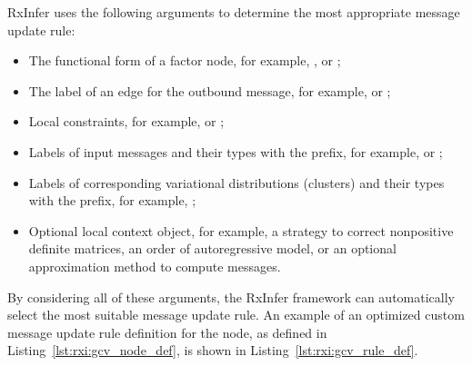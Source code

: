 
RxInfer uses the following arguments to determine the most appropriate message update rule:
  \begin{itemize} \itemsep0em
  \item The functional form of a factor node, for example, ,  or ;
  \item The label of an edge for the outbound message, for example,  or ; 
  \item Local constraints, for example,  or ; 
  \item Labels of input messages and their types with the  prefix, for example,  or ;
  \item Labels of corresponding variational distributions (clusters) and their types with the  prefix, for example, ; 
  \item Optional local context object, for example, a strategy to correct nonpositive definite matrices, an order of autoregressive model, or an optional approximation method to compute messages.
\end{itemize}

By considering all of these arguments, the RxInfer framework can automatically select the most suitable message update rule.
An example of an optimized custom message update rule definition for the  node, as
defined in Listing~\ref{lst:rxi:gcv_node_def}, is shown in Listing~\ref{lst:rxi:gcv_rule_def}.
\begin{figure*}[h!]
  \begin{adjustbox}{minipage=\textwidth,margin=0pt \smallskipamount,center}
  \end{adjustbox}
\end{figure*}

